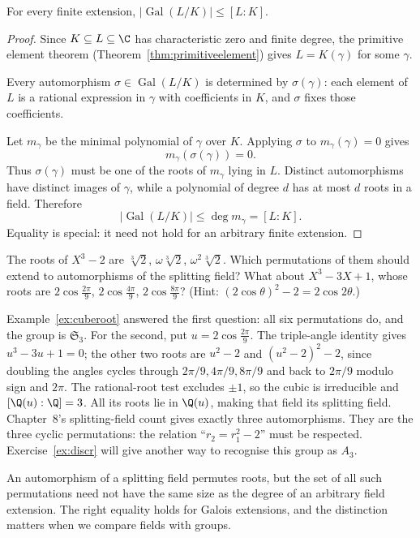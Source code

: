 \begin{proposition}\label{prop:autbound}
For every finite extension, $|\operatorname{Gal}(L/K)|\le[L:K]$.
\end{proposition}
\begin{proof}
Since $K\subseteq L\subseteq\C$ has characteristic
zero and finite degree, the primitive element theorem
(Theorem~\ref{thm:primitiveelement}) gives
$L=K(\gamma)$ for some $\gamma$.

Every automorphism $\sigma\in\operatorname{Gal}(L/K)$
is determined by $\sigma(\gamma)$: each element of
$L$ is a rational expression in $\gamma$ with
coefficients in $K$, and $\sigma$ fixes those
coefficients.

Let $m_\gamma$ be the minimal polynomial of
$\gamma$ over $K$. Applying $\sigma$ to
$m_\gamma(\gamma)=0$ gives
\[
m_\gamma(\sigma(\gamma))=0.
\]
Thus $\sigma(\gamma)$ must be one of the roots
of $m_\gamma$ lying in $L$. Distinct automorphisms
have distinct images of $\gamma$, while a polynomial
of degree $d$ has at most $d$ roots in a field.
Therefore
\[
\boxed{|\operatorname{Gal}(L/K)|
\le\deg m_\gamma=[L:K]}.
\]
Equality is special: it need not hold for an
arbitrary finite extension.
\end{proof}

\begin{think}
The roots of $X^3-2$ are $\sqrt[3]2$, $\omega\sqrt[3]2$, $\omega^2\sqrt[3]2$. Which permutations of them should extend to automorphisms of the splitting field? What about $X^3-3X+1$, whose roots are $2\cos\frac{2\pi}9$, $2\cos\frac{4\pi}9$, $2\cos\frac{8\pi}9$? (Hint: $(2\cos\theta)^2-2=2\cos2\theta$.)
\end{think}

Example~\ref{ex:cuberoot} answered the first question: all six permutations do, and the group is $\mathfrak S_3$. For the second, put $u=2\cos\frac{2\pi}9$.
The triple-angle identity gives $u^3-3u+1=0$; the other two roots are
$u^2-2$ and $(u^2-2)^2-2$, since doubling the angles cycles through
$2\pi/9,4\pi/9,8\pi/9$ and back to $2\pi/9$ modulo sign and $2\pi$.
The rational-root test excludes $\pm1$, so the cubic is irreducible
and $[\Q(u):\Q]=3$. All its roots lie in $\Q(u)$, making that field
its splitting field. Chapter~8's splitting-field count gives exactly
three automorphisms. They are the three cyclic permutations: the
relation ``$r_2=r_1^2-2$'' must be respected. Exercise~\ref{ex:discr}
will give another way to recognise this group as $A_3$.

An automorphism of a splitting field permutes roots, but the set of all such permutations need not have the same size as the degree of an arbitrary field extension. The right equality holds for Galois extensions, and the distinction matters when we compare fields with groups.

